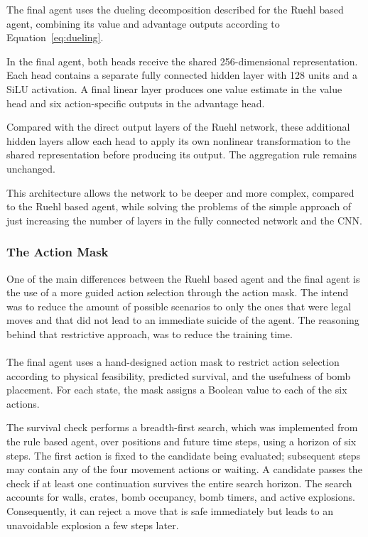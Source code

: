 \documentclass[11pt,a4paper]{article}
\begin{document}
The final agent uses the dueling decomposition described for the
Ruehl based agent, combining its value and advantage outputs
according to Equation~\eqref{eq:dueling}.

In the final agent, both heads receive the shared 256-dimensional
representation. Each head contains a separate fully connected
hidden layer with 128 units and a SiLU activation. A final linear
layer produces one value estimate in the value head and six
action-specific outputs in the advantage head.

Compared with the direct output layers of the Ruehl network,
these additional hidden layers allow each head to apply its own
nonlinear transformation to the shared representation before
producing its output. The aggregation rule remains unchanged.

This architecture allows the network to be deeper and more complex, compared to the Ruehl based agent, while solving the problems of the simple approach of just increasing the number of layers in the fully connected network and the CNN. 

\subsubsection{The Action Mask}
One of the main differences between the Ruehl based agent and the final agent is the use of a more guided action selection through the action mask. The intend was to reduce the amount of possible scenarios to only the ones that were legal moves and that did not lead to an immediate suicide of the agent. The reasoning behind that restrictive approach, was to reduce the training time.\\\\
The final agent uses a hand-designed action mask to restrict action
selection according to physical feasibility, predicted survival, and
the usefulness of bomb placement. For each state, the mask assigns
a Boolean value to each of the six actions.

The survival check performs a breadth-first search, which was implemented from the rule based agent, over positions and
future time steps, using a horizon of six steps. The first action is
fixed to the candidate being evaluated; subsequent steps may contain
any of the four movement actions or waiting. A candidate passes the
check if at least one continuation survives the entire search horizon.
The search accounts for walls, crates, bomb occupancy, bomb timers,
and active explosions. Consequently, it can reject a move that is
safe immediately but leads to an unavoidable explosion a few steps
later.
\end{document}
